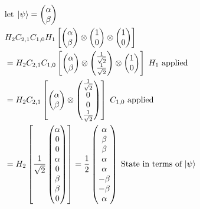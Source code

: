 \documentclass[conference]{IEEEtran}
\begin{document}
\begin{align*}
& \text{let} \; \ket{\psi} = \begin{pmatrix}\alpha\\\beta\end{pmatrix}\\ 
& H_2C_{2,1}C_{1,0}H_1
\left [
\begin{pmatrix} \alpha \\ \beta \end{pmatrix} \otimes \begin{pmatrix} 1 \\ 0\end{pmatrix} \otimes \begin{pmatrix} 1 \\ 0\end{pmatrix}
\right ]\\
&= H_2C_{2,1}C_{1,0}
\left [
\begin{pmatrix} \alpha \\ \beta \end{pmatrix} \otimes \begin{pmatrix} \frac{1}{\sqrt{2}} \\ \frac{1}{\sqrt{2}} \end{pmatrix} \otimes \begin{pmatrix} 1 \\ 0\end{pmatrix} \right ] \; \text{$H_1$ applied}\\
&= H_2C_{2,1} \left [ \begin{pmatrix} \alpha \\ \beta \end{pmatrix} \otimes \begin{pmatrix} \frac{1}{\sqrt{2}} \\ 0 \\ 0 \\ \frac{1}{\sqrt{2}} \end{pmatrix} \right ] \; \text{$C_{1,0}$ applied}\\
&= H_2 \left [ \frac{1}{\sqrt{2}} \begin{pmatrix} \alpha \\ 0 \\ 0 \\ \alpha \\ 0 \\ \beta \\ \beta \\ 0 \end{pmatrix} \right ] = \frac{1}{2} \begin{pmatrix} \alpha \\ \beta \\ \beta \\ \alpha \\ \alpha \\ -\beta \\ -\beta \\ \alpha \end{pmatrix} \; \text{State in terms of $\ket{\psi}$}
\end{align*}
\end{document}

